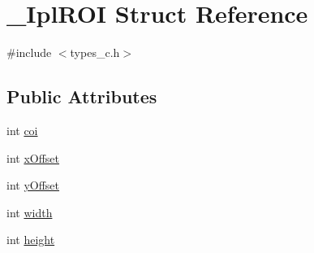 \hypertarget{struct__IplROI}{\section{\-\_\-\-Ipl\-R\-O\-I Struct Reference}
\label{struct__IplROI}
}


{\ttfamily \#include $<$types\-\_\-c.\-h$>$}

\subsection*{Public Attributes}
\begin{DoxyCompactItemize}
\item 
int \hyperlink{struct__IplROI_ad911c8b1bcea1a26e92cd8627e1ae3a1}{coi}
\item 
int \hyperlink{struct__IplROI_ae5f153b9938d43ef2e18617d86da9259}{x\-Offset}
\item 
int \hyperlink{struct__IplROI_a7487c8cdc2887400c7dd49eb0a3361a3}{y\-Offset}
\item 
int \hyperlink{struct__IplROI_a53c1aeda57cd135791442e5a1c7bfc9a}{width}
\item 
int \hyperlink{struct__IplROI_a3b5425f150fdf07de23b4bafd06d7fb3}{height}
\end{DoxyCompactItemize}


